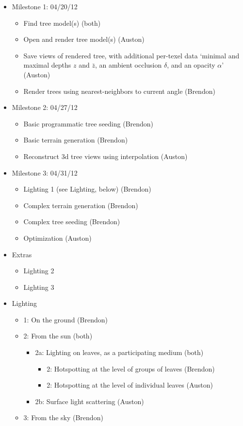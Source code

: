 \documentclass{article}
\begin{document}
\begin{itemize}
\item Milestone 1: 04/20/12
\begin{itemize}
\item Find tree model(s) (both)
\item Open and render tree model(s) (Auston)
\item Save views of rendered tree, with additional per-texel data ‘minimal and maximal depths $z$ and $\bar{z}$, an ambient occlusion $\delta$, and an opacity $\alpha$’\cite{trees} (Auston)
\item Render trees using nearest-neighbors to current angle (Brendon)
\end{itemize}

\item Milestone 2: 04/27/12
\begin{itemize}
\item Basic programmatic tree seeding (Brendon)
\item Basic terrain generation (Brendon)
\item Reconstruct 3d tree views using interpolation (Auston)
\end{itemize}

\item Milestone 3: 04/31/12
\begin{itemize}
\item Lighting 1 (see Lighting, below) (Brendon)
\item Complex terrain generation (Brendon)
\item Complex tree seeding (Brendon)
\item Optimization (Auston)
\end{itemize}

\item Extras
\begin{itemize}
\item Lighting 2
\item Lighting 3
\end{itemize}

\item Lighting 
\begin{itemize}
\item 1: On the ground (Brendon)
\item 2: From the sun (both)
\begin{itemize}
\item 2a: Lighting on leaves, as a participating medium (both)
\begin{itemize}
\item 2: Hotspotting at the level of groups of leaves (Brendon)
\item 2: Hotspotting at the level of individual leaves (Auston)
\end{itemize}
\item 2b: Surface light scattering (Auston)
\end{itemize}

\item 3: From the sky (Brendon)
\end{itemize}

\end{itemize}
\end{document}
